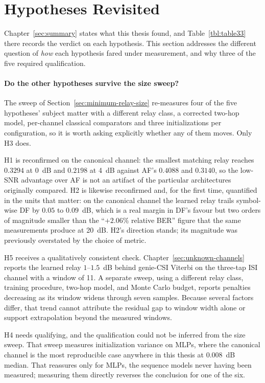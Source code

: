 \section{Hypotheses Revisited}\label{sec:conclusions}

Chapter~\ref{sec:summary} states what this thesis found, and Table~\ref{tbl:table33} there records the verdict on each hypothesis. This section addresses the different question of \emph{how} each hypothesis fared under measurement, and why three of the five required qualification.

\paragraph{Do the other hypotheses survive the size sweep?} The sweep of Section~\ref{sec:minimum-relay-size} re-measures four of the five hypotheses' subject matter with a different relay class, a corrected two-hop model, per-channel classical comparators and three initializations per configuration, so it is worth asking explicitly whether any of them moves. Only H3 does.

H1 is reconfirmed on the canonical channel: the smallest matching relay reaches $0.3294$ at 0~dB and $0.2198$ at 4~dB against AF's $0.4088$ and $0.3140$, so the low-SNR advantage over AF is not an artifact of the particular architectures originally compared. H2 is likewise reconfirmed and, for the first time, quantified in the units that matter: on the canonical channel the learned relay trails symbol-wise DF by $0.05$ to $0.09$~dB, which is a real margin in DF's favour but two orders of magnitude smaller than the ``$+2.06\%$ relative BER'' figure that the same measurements produce at 20~dB. H2's direction stands; its magnitude was previously overstated by the choice of metric.

H5 receives a qualitatively consistent check. Chapter~\ref{sec:unknown-channels} reports the learned relay $1$--$1.5$~dB behind genie-CSI Viterbi on the three-tap ISI channel with a window of 11. A separate sweep, using a different relay class, training procedure, two-hop model, and Monte Carlo budget, reports penalties decreasing as its window widens through seven samples. Because several factors differ, that trend cannot attribute the residual gap to window width alone or support extrapolation beyond the measured windows.

H4 needs qualifying, and the qualification could not be inferred from the size sweep. That sweep measures initialization variance on MLPs, where the canonical channel is the most reproducible case anywhere in this thesis at $0.008$~dB median. That reassures only for MLPs, the sequence models never having been measured; measuring them directly reverses the conclusion for one of the six.

